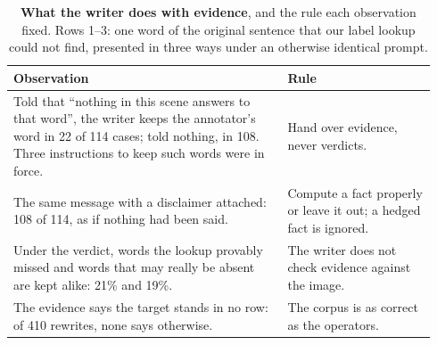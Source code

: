 \begin{table}[t]
\centering
\small
\caption{\textbf{What the writer does with evidence}, and the rule each observation fixed. Rows 1--3: one word of the original sentence that our label lookup could not find, presented in three ways under an otherwise identical prompt.}
\label{tab:principles}
\begin{tabular}{@{}p{0.61\linewidth}p{0.33\linewidth}@{}}
\toprule
Observation & Rule \\
\midrule
Told that ``nothing in this scene answers to that word'', the writer keeps the annotator's word in 22 of 114 cases; told nothing, in 108. Three instructions to keep such words were in force. & Hand over evidence, never verdicts. \\
\addlinespace
The same message with a disclaimer attached: 108 of 114, as if nothing had been said. & Compute a fact properly or leave it out; a hedged fact is ignored. \\
\addlinespace
Under the verdict, words the lookup provably missed and words that may really be absent are kept alike: 21\% and 19\%. & The writer does not check evidence against the image. \\
\addlinespace
The evidence says the target stands in no row: of 410 rewrites, none says otherwise. & The corpus is as correct as the operators. \\
\bottomrule
\end{tabular}
\end{table}
